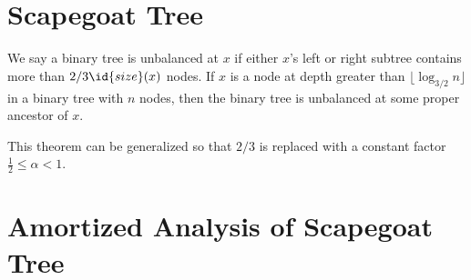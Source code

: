 \section{Scapegoat Tree}

\begin{theorem}
    We say a binary tree is unbalanced at $x$ if either $x$'s left or right subtree contains more than $2/3 \id{size}(x)$ nodes. If $x$ is a node at depth greater than $\lfloor \log_{3/2} n \rfloor$ in a binary tree with $n$ nodes, then the binary tree is unbalanced at some proper ancestor of $x$. 
\end{theorem}

This theorem can be generalized so that $2/3$ is replaced with a constant factor $\frac{1}{2} \leq \alpha < 1$.

\section{Amortized Analysis of Scapegoat Tree}